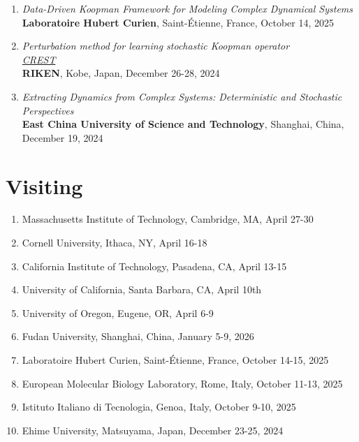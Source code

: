 \documentclass[margin]{res}
\begin{document}
\begin{resume}
\begin{enumerate}
    \item {\sl Data-Driven Koopman Framework for Modeling Complex Dynamical Systems} \\
    \textbf{Laboratoire Hubert Curien}, Saint-Étienne, France, October 14, 2025
    
    
    \item {\sl Perturbation method for learning stochastic Koopman operator} \\
    \href{https://docs.google.com/spreadsheets/d/1XrgG53J6HlsHYLRHtYFsj5s32eWDr9B_/edit?gid=1512777206#gid=1512777206}{\sl CREST} \\
    \textbf{RIKEN}, Kobe, Japan, December 26-28, 2024

    \item {\sl Extracting Dynamics from Complex Systems: Deterministic and Stochastic Perspectives} \\
    \textbf{East China University of Science and Technology}, Shanghai, China, December 19, 2024
\end{enumerate}


\section{Visiting}
\begin{enumerate}
    \item Massachusetts Institute of Technology, Cambridge, MA, April 27-30
    \item Cornell University, Ithaca, NY, April 16-18 
    \item California Institute of Technology, Pasadena, CA, April 13-15 
    \item University of California, Santa Barbara, CA, April 10th  
    \item University of Oregon, Eugene, OR, April 6-9 
    \item Fudan University, Shanghai, China, January 5-9, 2026
    \item Laboratoire Hubert Curien, Saint-Étienne, France, October 14-15, 2025
    \item European Molecular Biology Laboratory, Rome, Italy, October 11-13, 2025
    \item Istituto Italiano di Tecnologia, Genoa, Italy, October 9-10, 2025
    \item Ehime University, Matsuyama, Japan, December 23-25, 2024
\end{enumerate}


\end{resume}
\end{document}
